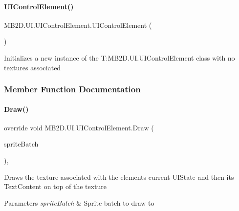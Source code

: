 \paragraph{\texorpdfstring{U\+I\+Control\+Element()}{UIControlElement()}\hspace{0.1cm}{\footnotesize\ttfamily [2/2]}}
{\footnotesize\ttfamily M\+B2\+D.\+U\+I.\+U\+I\+Control\+Element.\+U\+I\+Control\+Element (\begin{DoxyParamCaption}{ }\end{DoxyParamCaption})\hspace{0.3cm}{\ttfamily [inline]}}



Initializes a new instance of the T\+:\+M\+B2\+D.\+U\+I.\+U\+I\+Control\+Element class with no textures associated 



\subsubsection{Member Function Documentation}
\hypertarget{class_m_b2_d_1_1_u_i_1_1_u_i_control_element_afac0cbbbbead7c7348401075cda433ba}{}\label{class_m_b2_d_1_1_u_i_1_1_u_i_control_element_afac0cbbbbead7c7348401075cda433ba} 
\paragraph{\texorpdfstring{Draw()}{Draw()}}
{\footnotesize\ttfamily override void M\+B2\+D.\+U\+I.\+U\+I\+Control\+Element.\+Draw (\begin{DoxyParamCaption}\item[{Sprite\+Batch}]{sprite\+Batch }\end{DoxyParamCaption})\hspace{0.3cm}{\ttfamily [inline]}, {\ttfamily [virtual]}}



Draws the texture associated with the elements current U\+I\+State and then its Text\+Content on top of the texture 


\begin{DoxyParams}{Parameters}
{\em sprite\+Batch} & Sprite batch to draw to\\
\hline
\end{DoxyParams}


